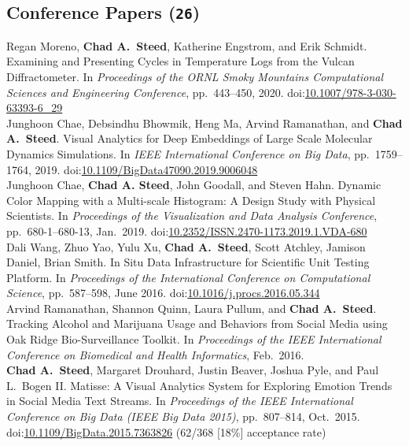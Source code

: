 \documentclass[11pt, letterpaper]{article}
\newcommand{\years}[1]{\marginnote{\scriptsize #1}}
\begin{document}
\subsection*{Conference Papers (\texttt{26})}
\begin{sloppypar}
\noindent\years{2020}Regan Moreno, \textbf{Chad A.~Steed}, Katherine Engstrom, and Erik Schmidt. Examining and Presenting Cycles in Temperature Logs from the Vulcan Diffractometer. In \emph{Proceedings of the ORNL Smoky Mountains Computational Sciences and Engineering Conference}, pp.\ 443--450, 2020. doi:\href{https://doi.org/10.1007/978-3-030-63393-6_29}{10.1007/978-3-030-63393-6\_29}\\
\years{2019}Junghoon Chae, Debsindhu Bhowmik, Heng Ma, Arvind Ramanathan, and \textbf{Chad A.~Steed}. Visual Analytics for Deep Embeddings of Large Scale Molecular Dynamics Simulations. In \emph{IEEE International Conference on Big Data}, pp.\ 1759--1764, 2019. doi:\href{https://doi.org/10.1109/BigData47090.2019.9006048}{10.1109/BigData47090.2019.9006048}\\
\years{2019}Junghoon Chae, \textbf{Chad A. Steed}, John Goodall, and Steven Hahn. Dynamic Color Mapping with a Multi-scale Histogram: A Design Study with Physical Scientists. In \emph{Proceedings of the Visualization and Data Analysis Conference}, pp.\ 680-1--680-13, Jan.\ 2019. doi:\href{https://doi.org/10.2352/ISSN.2470-1173.2019.1.VDA-680}{10.2352/ISSN.2470-1173.2019.1.VDA-680}\\
\years{2016}Dali Wang, Zhuo Yao, Yulu Xu, \textbf{Chad A.\ Steed},
Scott Atchley, Jamison Daniel, Brian Smith. In Situ Data Infrastructure for
Scientific Unit Testing Platform.
In \emph{Proceedings of the International Conference on Computational Science},
pp.\ 587--598, June 2016. doi:\href{http://dx.doi.org/10.1016/j.procs.2016.05.344}{10.1016/j.procs.2016.05.344}\\
\years{2016}Arvind Ramanathan, Shannon Quinn, Laura Pullum, and
\textbf{Chad A.\ Steed}. Tracking Alcohol and Marijuana Usage and Behaviors
from Social Media using Oak Ridge Bio-Surveillance Toolkit.
In \emph{Proceedings of the IEEE International Conference on Biomedical and
Health Informatics}, Feb.\ 2016.\\
\years{2015}\textbf{Chad A.\ Steed}, Margaret Drouhard, Justin
Beaver, Joshua Pyle, and Paul L.\ Bogen II. Matisse: A Visual Analytics
System for Exploring Emotion Trends in Social Media Text Streams.
In \emph{Proceedings of the IEEE International Conference on Big Data (IEEE
Big Data 2015)}, pp.\ 807--814, Oct.\ 2015. doi:\href{http://dx.doi.org/10.1109/BigData.2015.7363826}{10.1109/BigData.2015.7363826} (62/368 [18\%] acceptance rate)\\

\end{sloppypar}
\end{document}
